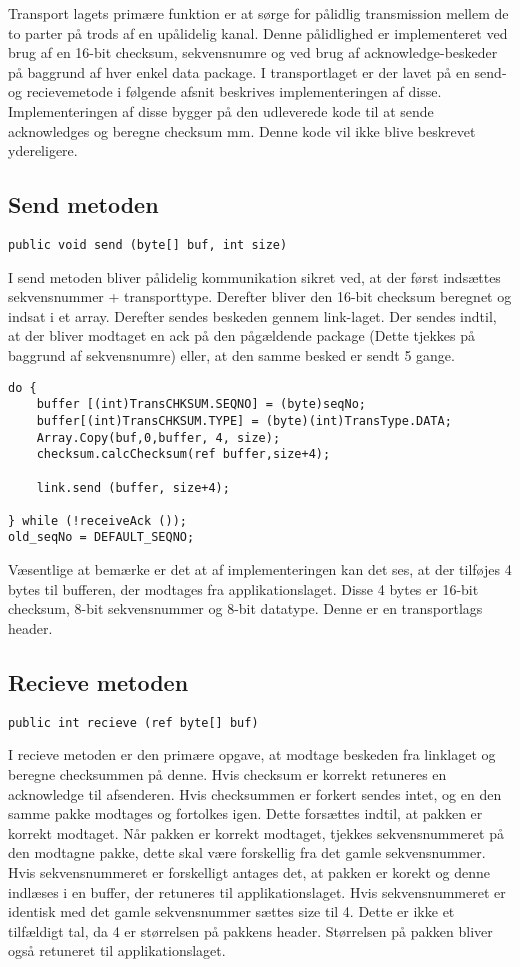 Transport lagets primære funktion er at sørge for pålidlig transmission mellem de to parter på trods af en upålidelig kanal. 
Denne pålidlighed er implementeret ved brug af en 16-bit checksum, sekvensnumre og ved brug af acknowledge-beskeder på baggrund af hver enkel data package. 
I transportlaget er der lavet på en send- og recievemetode i følgende afsnit beskrives implementeringen af disse. Implementeringen af disse bygger på den udleverede kode til at sende acknowledges og beregne checksum mm. Denne kode vil ikke blive beskrevet ydereligere.

\subsection{Send metoden}
\begin{verbatim}
public void send (byte[] buf, int size)
\end{verbatim}
I send metoden bliver pålidelig kommunikation sikret ved, at der først indsættes sekvensnummer + transporttype. Derefter bliver den 16-bit checksum beregnet og indsat i et array. Derefter sendes beskeden gennem link-laget. Der sendes indtil, at der bliver modtaget en ack på den pågældende package (Dette tjekkes på baggrund af sekvensnumre) eller, at den samme besked er sendt 5 gange.
\begin{lstlisting}
do {
	buffer [(int)TransCHKSUM.SEQNO] = (byte)seqNo;
	buffer[(int)TransCHKSUM.TYPE] = (byte)(int)TransType.DATA;
	Array.Copy(buf,0,buffer, 4, size);
	checksum.calcChecksum(ref buffer,size+4);

	link.send (buffer, size+4);

} while (!receiveAck ());	
old_seqNo = DEFAULT_SEQNO;	
\end{lstlisting}

\noindent Væsentlige at bemærke er det at af implementeringen kan det ses, at der tilføjes 4 bytes til bufferen, der modtages fra applikationslaget. Disse 4 bytes er 16-bit checksum, 8-bit sekvensnummer og 8-bit datatype. Denne er en transportlags header. 

\subsection{Recieve metoden}
\begin{verbatim}
public int recieve (ref byte[] buf)
\end{verbatim}

I recieve metoden er den primære opgave, at modtage beskeden fra linklaget og beregne checksummen på denne. Hvis checksum er korrekt retuneres en acknowledge til afsenderen. Hvis checksummen er forkert sendes intet, og en den samme pakke modtages og fortolkes igen. Dette forsættes indtil, at pakken er korrekt modtaget. Når pakken er korrekt modtaget, tjekkes sekvensnummeret på den modtagne pakke, dette skal være forskellig fra det gamle sekvensnummer. Hvis sekvensnummeret er forskelligt antages det, at pakken er korekt og denne indlæses i en buffer, der retuneres til applikationslaget. Hvis sekvensnummeret er identisk med det gamle sekvensnummer sættes size til 4. Dette er ikke et tilfældigt tal, da 4 er størrelsen på pakkens header. Størrelsen på pakken bliver også retuneret til applikationslaget.

